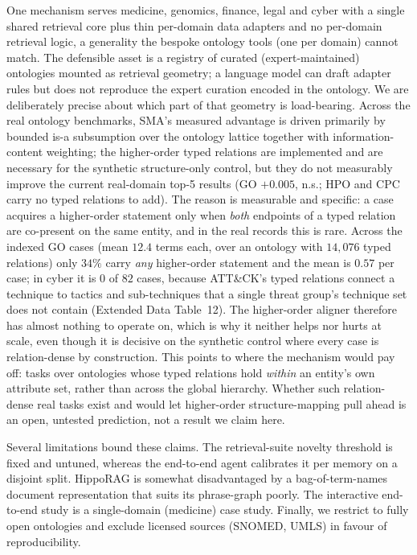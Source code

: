 \documentclass[pdflatex,sn-nature]{sn-jnl}
\begin{document}
One mechanism serves medicine, genomics, finance, legal and cyber with a single
shared retrieval core plus thin per-domain data adapters and no per-domain
retrieval logic, a generality the bespoke ontology tools (one per domain) cannot
match. The defensible asset is a registry of curated (expert-maintained)
ontologies mounted as retrieval geometry; a language model can draft adapter rules
but does not reproduce the expert curation encoded in the ontology. We are
deliberately precise about which part of that geometry is load-bearing. Across the
real ontology benchmarks, SMA's measured advantage is driven primarily by bounded
is-a subsumption over the ontology lattice together with information-content
weighting; the higher-order typed relations are implemented and are necessary for
the synthetic structure-only control, but they do not measurably improve the
current real-domain top-5 results (GO $+0.005$, n.s.; HPO and CPC carry no typed
relations to add). The reason is measurable and specific: a case acquires a
higher-order statement only when \emph{both} endpoints of a typed relation are
co-present on the same entity, and in the real records this is rare. Across the
indexed GO cases (mean $12.4$ terms each, over an ontology with $14{,}076$ typed
relations) only $34\%$ carry \emph{any} higher-order statement and the mean is
$0.57$ per case; in cyber it is $0$ of $82$ cases, because ATT\&CK's typed
relations connect a technique to tactics and sub-techniques that a single threat
group's technique set does not contain (Extended Data Table~12). The higher-order
aligner therefore has almost nothing to operate on, which is why it neither helps
nor hurts at scale, even though it is decisive on the synthetic control where every
case is relation-dense by construction. This points to where the mechanism would
pay off: tasks over ontologies whose typed relations hold \emph{within} an entity's
own attribute set, rather than across the global hierarchy. Whether such
relation-dense real tasks exist and would let higher-order structure-mapping pull
ahead is an open, untested prediction, not a result we claim here.

Several limitations bound these claims. The retrieval-suite novelty threshold is
fixed and untuned, whereas the end-to-end agent calibrates it per memory on a
disjoint split. HippoRAG is somewhat disadvantaged by a bag-of-term-names document
representation that suits its phrase-graph poorly. The interactive end-to-end
study is a single-domain (medicine) case study. Finally, we restrict to fully open
ontologies and exclude licensed sources (SNOMED, UMLS) in favour of
reproducibility.
\end{document}
